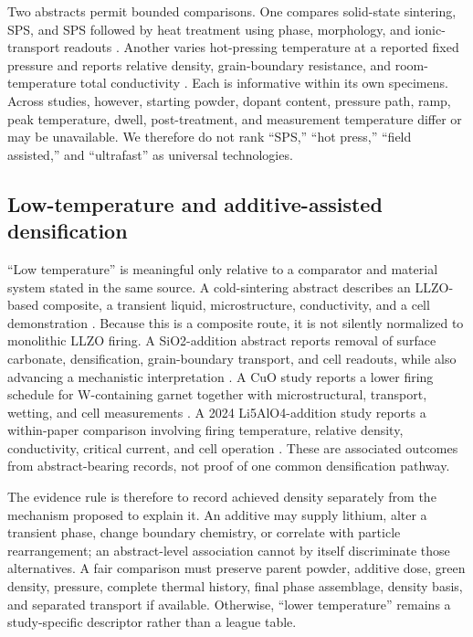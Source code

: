Two abstracts permit bounded comparisons. One compares solid-state sintering, SPS, and SPS followed by heat treatment using phase, morphology, and ionic-transport readouts \cite{xue2020spark}. Another varies hot-pressing temperature at a reported fixed pressure and reports relative density, grain-boundary resistance, and room-temperature total conductivity \cite{david2015microstructure}. Each is informative within its own specimens. Across studies, however, starting powder, dopant content, pressure path, ramp, peak temperature, dwell, post-treatment, and measurement temperature differ or may be unavailable. We therefore do not rank ``SPS,'' ``hot press,'' ``field assisted,'' and ``ultrafast'' as universal technologies.

\subsection{Low-temperature and additive-assisted densification}

``Low temperature'' is meaningful only relative to a comparator and material system stated in the same source. A cold-sintering abstract describes an LLZO-based composite, a transient liquid, microstructure, conductivity, and a cell demonstration \cite{seo2020broad}. Because this is a composite route, it is not silently normalized to monolithic LLZO firing. A SiO2-addition abstract reports removal of surface carbonate, densification, grain-boundary transport, and cell readouts, while also advancing a mechanistic interpretation \cite{zhang2020enhanced}. A CuO study reports a lower firing schedule for W-containing garnet together with microstructural, transport, wetting, and cell measurements \cite{zhang2019effects}. A 2024 Li5AlO4-addition study reports a within-paper comparison involving firing temperature, relative density, conductivity, critical current, and cell operation \cite{zhou2024li5alo4}. These are associated outcomes from abstract-bearing records, not proof of one common densification pathway.

The evidence rule is therefore to record achieved density separately from the mechanism proposed to explain it. An additive may supply lithium, alter a transient phase, change boundary chemistry, or correlate with particle rearrangement; an abstract-level association cannot by itself discriminate those alternatives. A fair comparison must preserve parent powder, additive dose, green density, pressure, complete thermal history, final phase assemblage, density basis, and separated transport if available. Otherwise, ``lower temperature'' remains a study-specific descriptor rather than a league table.
